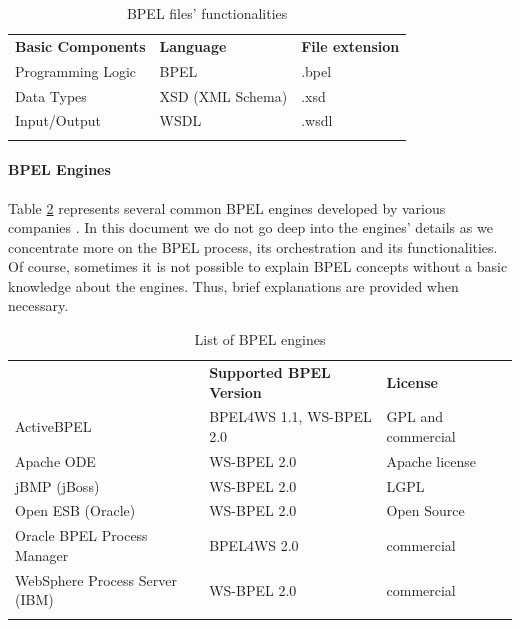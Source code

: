 \begin{table}[h!]
\begin{center}
\begin{tabular}{l l l}
						\toprule
						\addlinespace[0.2cm]
\textbf{Basic Components} 	& \textbf{Language} 	& \textbf{File extension} 	\\ 
						\cmidrule(l){1-3}
Programming Logic 		& BPEL			& .bpel 			\\[0,1cm]
Data Types 			& XSD (XML Schema) 	& .xsd 				\\[0,1cm]
Input/Output 			& WSDL 			& .wsdl 			\\[0,1cm]
						\addlinespace[0.2cm]
						\bottomrule
\end{tabular}
\end{center}
\caption{BPEL files' functionalities}
\label{BPELfilesTable}
\end{table}


\paragraph{BPEL Engines}
Table \ref{BPELengines} represents several common BPEL engines developed by various companies \cite{BPELenginesComparisonOnWikipedia}. In this document we do not go deep into the engines' details as we concentrate more on the BPEL process, its orchestration and its functionalities. Of course, sometimes it is not possible to explain BPEL concepts without a basic knowledge about the engines. Thus, brief explanations are provided when necessary.


\begin{table}
\begin{center}
\begin{tabular}{l l l}  %
						\toprule
						\addlinespace[0.2cm]
{\bf Name of BPEL Engine} 	& {\bf Supported BPEL Version} 	& {\bf License} 	\\
						\cmidrule(l){1-3}
ActiveBPEL         		& BPEL4WS 1.1, WS-BPEL 2.0 	& GPL and commercial 	\\[0,1cm]
Apache ODE         		& WS-BPEL 2.0 			& Apache license	\\[0,1cm]
jBMP (jBoss)         		& WS-BPEL 2.0 			& LGPL			\\[0,1cm]
Open ESB (Oracle)		& WS-BPEL 2.0 			& Open Source		\\[0,1cm] 
Oracle BPEL Process Manager   	& BPEL4WS 2.0 			& commercial		\\[0,1cm]
WebSphere Process Server (IBM)	& WS-BPEL 2.0			& commercial		\\[0,1cm]
						\addlinespace[0.2cm]
						\bottomrule
\end{tabular}
\end{center}
\caption{List of BPEL engines}
\label{BPELengines}
\end{table}
